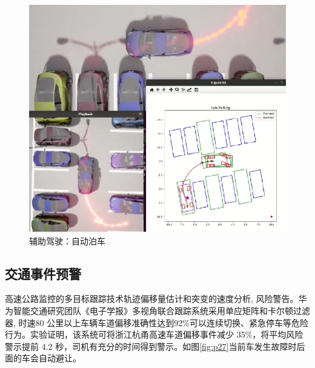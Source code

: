 \begin{figure}[htbp] %
	\centering
	\includegraphics[width=1\textwidth]{p28} %
	\caption{辅助驾驶：自动泊车} %
	\label{fig:p28} %
\end{figure}




\subsection{交通事件预警}



高速公路监控的多目标跟踪技术轨迹偏移量估计和突变的速度分析, 风险警告。华为智能交通研究团队《电子学报》\cite{huawei2020highway}多视角联合跟踪系统采用单应矩阵和卡尔顿过滤器, 时速80 公里以上车辆车道偏移准确性达到92\%可以连续切换、紧急停车等危险行为。实验证明，该系统可将浙江杭甬高速车道偏移事件减少 35\%，将平均风险警示提前 4.2 秒，司机有充分的时间得到警示。如图\ref{fig:p27}当前车发生故障时后面的车会自动避让。





